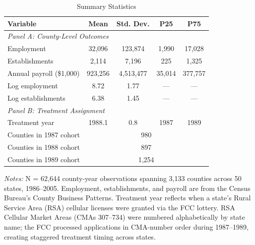 \begin{table}[H]
\centering
\caption{Summary Statistics}
\begin{threeparttable}
\begin{tabular}{lcccc}
\toprule
Variable & Mean & Std. Dev. & P25 & P75 \\
\midrule
\multicolumn{5}{l}{\textit{Panel A: County-Level Outcomes}} \\[3pt]
Employment & 32,096 & 123,874 & 1,990 & 17,028 \\
Establishments & 2,114 & 7,196 & 225 & 1,325 \\
Annual payroll (\$1,000) & 923,256 & 4,513,477 & 35,014 & 377,757 \\
Log employment & 8.72 & 1.77 & --- & --- \\
Log establishments & 6.38 & 1.45 & --- & --- \\[6pt]
\multicolumn{5}{l}{\textit{Panel B: Treatment Assignment}} \\[3pt]
Treatment year & 1988.1 & 0.8 & 1987 & 1989 \\
Counties in 1987 cohort & \multicolumn{4}{c}{980} \\
Counties in 1988 cohort & \multicolumn{4}{c}{897} \\
Counties in 1989 cohort & \multicolumn{4}{c}{1,254} \\
\bottomrule
\end{tabular}
\begin{tablenotes}[flushleft]
\small
\item \textit{Notes:} N = 62,644 county-year observations spanning 3,133 counties across 50 states, 1986--2005. Employment, establishments, and payroll are from the Census Bureau's County Business Patterns. Treatment year reflects when a state's Rural Service Area (RSA) cellular licenses were granted via the FCC lottery. RSA Cellular Market Areas (CMAs 307--734) were numbered alphabetically by state name; the FCC processed applications in CMA-number order during 1987--1989, creating staggered treatment timing across states.
\end{tablenotes}
\end{threeparttable}
\label{tab:summary}
\end{table}
